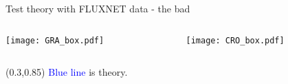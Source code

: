 \documentclass[aspectratio=169]{beamer}
\begin{document}
\begin{frame}{Test theory with FLUXNET data - the bad}
  \begin{columns}
    \begin{column}{0.5\textwidth}
      \texttt{[image: GRA\_box.pdf]}
    \end{column}
    \begin{column}{0.5\textwidth}
      \texttt{[image: CRO\_box.pdf]}
    \end{column}
  \end{columns}
  \begin{textblock*}{1.0\textwidth}(0.3\textwidth,0.85\textheight)
    \textcolor{blue}{Blue line} is theory.\\
  \end{textblock*}

\end{frame}



\end{document}
